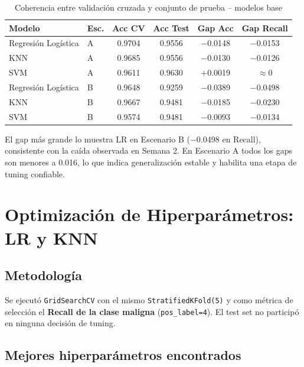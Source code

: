 \documentclass[11pt,a4paper]{article}
\begin{document}
\begin{table}[H]
\centering
\caption{Coherencia entre validación cruzada y conjunto de prueba -- modelos base}
\small
\renewcommand{\arraystretch}{1.15}
\begin{tabular}{llcccc}
\toprule
\textbf{Modelo} & \textbf{Esc.} & \textbf{Acc CV} & \textbf{Acc Test} & \textbf{Gap Acc} & \textbf{Gap Recall} \\
\midrule
Regresión Logística & A & 0.9704 & 0.9556 & $-$0.0148 & $-$0.0153 \\
KNN & A & 0.9685 & 0.9556 & $-$0.0130 & $-$0.0126 \\
SVM & A & 0.9611 & 0.9630 & $+$0.0019 & $\approx 0$ \\
\midrule
\rowcolor{warnrow}
Regresión Logística & B & 0.9648 & 0.9259 & $-$0.0389 & $-$0.0498 \\
KNN & B & 0.9667 & 0.9481 & $-$0.0185 & $-$0.0230 \\
SVM & B & 0.9574 & 0.9481 & $-$0.0093 & $-$0.0134 \\
\bottomrule
\end{tabular}
\normalsize
\end{table}

El gap más grande lo muestra LR en Escenario B ($-$0.0498 en Recall), consistente con la caída observada en Semana 2. En Escenario A todos los gaps son menores a 0.016, lo que indica generalización estable y habilita una etapa de tuning confiable.

\section{Optimización de Hiperparámetros: LR y KNN}

\subsection{Metodología}

Se ejecutó \texttt{GridSearchCV} con el mismo \texttt{StratifiedKFold(5)} y como métrica de selección el \textbf{Recall de la clase maligna} (\texttt{pos\_label=4}). El test set no participó en ninguna decisión de tuning.

\subsection{Mejores hiperparámetros encontrados}
\end{document}

